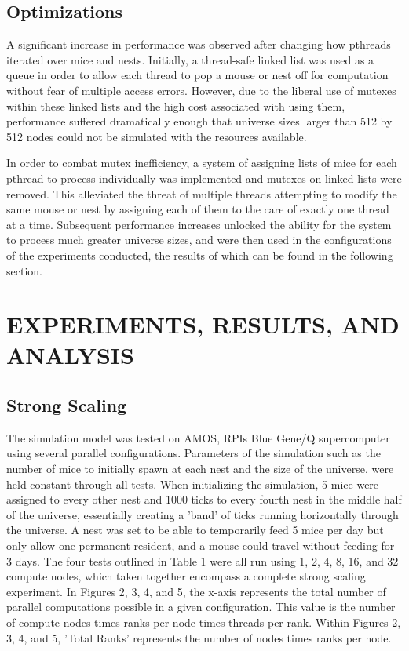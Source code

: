 \documentclass[letterpaper, 10 pt, conference]{ieeeconf}  %
\begin{document}
\subsection{Optimizations}
A significant increase in performance was observed after changing how pthreads iterated over mice and nests.  Initially, a thread-safe linked list was used as a queue in order to allow each thread to pop a mouse or nest off for computation without fear of multiple access errors.  However, due to the liberal use of mutexes within these linked lists and the high cost associated with using them, performance suffered dramatically enough that universe sizes larger than 512 by 512 nodes could not be simulated with the resources available.

In order to combat mutex inefficiency, a system of assigning lists of mice for each pthread to process individually was implemented and mutexes on linked lists were removed.  This alleviated the threat of multiple threads attempting to modify the same mouse or nest by assigning each of them to the care of exactly one thread at a time.  Subsequent performance increases unlocked the ability for the system to process much greater universe sizes, and were then used in the configurations of the experiments conducted, the results of which can be found in the following section.   

\section{EXPERIMENTS, RESULTS, AND ANALYSIS}

\subsection{Strong Scaling}

	The simulation model was tested on AMOS, RPI\textquotesingle s Blue Gene/Q supercomputer using several parallel configurations. Parameters of the simulation such as the number of mice to initially spawn at each nest and the size of the universe, were held constant through all tests. When initializing the simulation, 5 mice were assigned to every other nest and 1000 ticks to every fourth nest in the middle half of the universe, essentially creating a 'band' of ticks running horizontally through the universe.  A nest was set to be able to temporarily feed 5 mice per day but only allow one permanent resident, and a mouse could travel without feeding for 3 days. The four tests outlined in Table 1 were all run using 1, 2, 4, 8, 16, and 32 compute nodes, which taken together encompass a complete strong scaling experiment. In Figures 2, 3, 4, and 5, the x-axis represents the total number of parallel computations possible in a given configuration. This value is the number of compute nodes times ranks per node times threads per rank. Within Figures 2, 3, 4, and 5, 'Total Ranks' represents the number of nodes times ranks per node.
\end{document}
